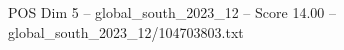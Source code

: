 \begin{textsample}{POS Dim 5 – global\_south\_2023\_12 – Score 14.00 – global\_south\_2023\_12/104703803.txt}
\end{textsample}

